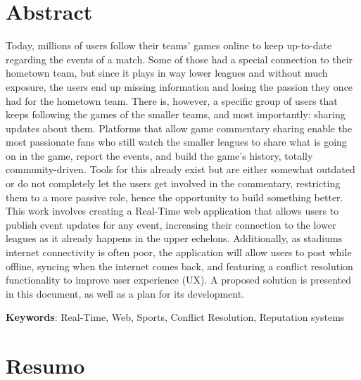 \chapter*{Abstract}

Today, millions of users follow their teams' games online to keep up-to-date regarding the events of a match. Some of those had a special connection to their hometown team, but since it plays in way lower leagues and without much exposure,  the users end up missing information and losing the passion they once had for the hometown team. There is, however,  a specific group of users that keeps following the games of the smaller teams, and most importantly: sharing updates about them. Platforms that allow game commentary sharing enable the most passionate fans who still watch the smaller leagues to share what is going on in the game, report the events, and build the game's history, totally community-driven. Tools for this already exist but are either somewhat outdated or do not completely let the users get involved in the commentary, restricting them to a more passive role, hence the opportunity to build something better. This work involves creating a Real-Time web application that allows users to publish event updates for any event, increasing their connection to the lower leagues as it already happens in the upper echelons. Additionally, as stadiums internet connectivity is often poor, the application will allow users to post while offline, syncing when the internet comes back, and featuring a conflict resolution functionality to improve user experience (UX). A proposed solution is presented in this document, as well as a plan for its development.


\vspace*{10mm}\noindent
\textbf{Keywords}: Real-Time, Web, Sports, Conflict Resolution, Reputation systems

\chapter*{Resumo}

